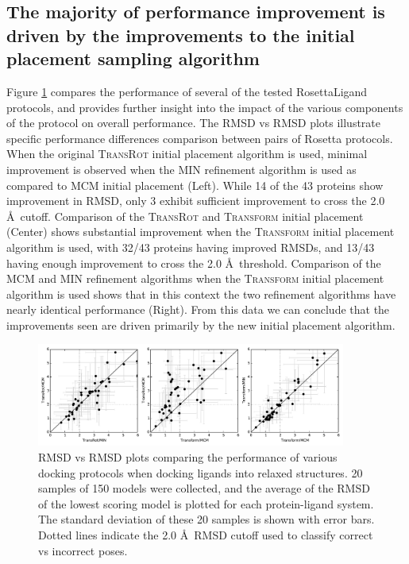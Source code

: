 \subsection{The majority of performance improvement is driven by the improvements to the initial placement sampling algorithm}
Figure \ref{fig:rmsd_vs_rmsd} compares the performance of several of the tested RosettaLigand protocols, and provides further insight into the impact of the various components of the protocol on overall performance.
The RMSD vs RMSD plots illustrate specific performance differences comparison between pairs of Rosetta protocols.
When the original \textsc{TransRot} initial placement algorithm is used, minimal improvement is observed when the MIN refinement algorithm is used as compared to MCM initial placement (Left).
While 14 of the 43 proteins show improvement in RMSD, only 3 exhibit sufficient improvement to cross the 2.0 \AA\ cutoff.
Comparison of the \textsc{TransRot} and \textsc{Transform} initial placement (Center) shows substantial improvement when the \textsc{Transform} initial placement algorithm is used, with 32/43 proteins having improved RMSDs, and 13/43 having enough improvement to cross the 2.0 \AA\ threshold.
Comparison of the MCM and MIN refinement algorithms when the \textsc{Transform} initial placement algorithm is used shows that in this context the two refinement algorithms have nearly identical performance (Right).
From this data we can conclude that the improvements seen are driven primarily by the new initial placement algorithm. 

\begin{figure}
\centering
\includegraphics[width=4in]{figures/lowres/rmsd_vs_rmsd_relax.pdf}
\caption{
RMSD vs RMSD plots comparing the performance of various docking protocols when docking ligands into relaxed structures.
20 samples of 150 models were collected, and the average of the RMSD of the lowest scoring model is plotted for each protein-ligand system.
The standard deviation of these 20 samples is shown with error bars. Dotted lines indicate the 2.0 \AA\ RMSD cutoff used to classify correct vs incorrect poses. 
}
\label{fig:rmsd_vs_rmsd}
\end{figure}

